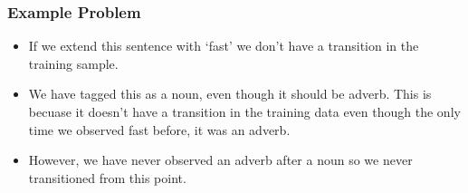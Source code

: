 \documentclass[11pt]{article}
\begin{document}
\begin{figure}[H]
    \centering
\end{figure}

\subsubsection{Example Problem}

\begin{minipage}[l]{.5\linewidth}
    \begin{figure}[H]
        \centering
    \end{figure}    
\end{minipage}\hfill
\begin{minipage}[r]{.48\linewidth}
    \begin{itemize}
        \item If we extend this sentence with `fast' we don't have a transition in the training sample. 
        \item We have tagged this as a noun, even though it should be adverb. This is becuase it doesn't have a transition in the training data even though the only time we observed fast before, it was an adverb.
        \item However, we have never observed an adverb after a noun so we never transitioned from this point. 
    \end{itemize}
\end{minipage}
\end{document}
